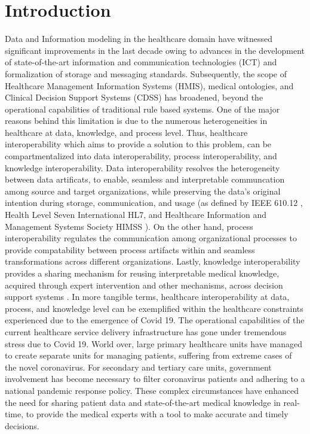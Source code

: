 
\section*{Introduction}
\label{intro}
Data and Information modeling in the healthcare domain have witnessed significant improvements in the last decade owing to advances in the development of state-of-the-art information and communication technologies (ICT) and formalization of storage and messaging standards. Subsequently, the scope of Healthcare Management Information Systems (HMIS), medical ontologies, and Clinical Decision Support Systems (CDSS) has broadened, beyond the operational capabilities of traditional rule based systems. One of the major reasons behind this limitation is due to the numerous heterogeneities in healthcare at data, knowledge, and process level. Thus, healthcare interoperability which aims to provide a solution to this problem, can be compartmentalized into data interoperability, process interoperability, and knowledge interoperability.
Data interoperability resolves the heterogeneity between data artificats, to enable, seamless and interpretable communcation among source and target organizations, while preserving the data's original intention during storage, communication, and usage (as defined by IEEE 610.12 \cite{geraci1991ieee}, Health Level Seven International HL7, and Healthcare Information and Management Systems Society HIMSS \cite{Himss_url2013}).
On the other hand, process interoperability regulates the communication among organizational processes to provide compatability between process artifacts within and seamless transformations across different organizations\cite{khan2013process}. Lastly, knowledge interoperability provides a sharing mechanism for reusing interpretable medical knowledge, acquired through expert intervention and other mechanisms, across decision support systems \cite{ali2017multi}.
In more tangible terms, healthcare interoperability at data, process, and knowledge level can be exemplified within the healthcare constraints experienced due to the emergence of Covid 19. The operational capabilities of the current healthcare service delivery infrastructure has gone under tremendous stress due to Covid 19. World over, large primary healthcare units have managed to create separate units for managing patients, suffering from extreme cases of the novel coronavirus. For secondary and tertiary care units, government involvement has become necessary to filter coronavirus patients and adhering to a national pandemic response policy. 
These complex circumstances have enhanced the need for sharing patient data and state-of-the-art medical knowledge in real-time, to provide the medical experts with a tool to make accurate and timely decisions.
